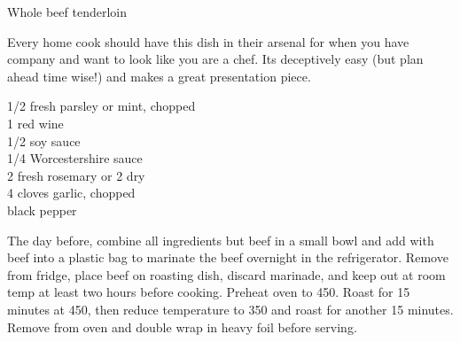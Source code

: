 \begin{entry}{Whole beef tenderloin}

\begin{open}
  Every home cook should have this dish in their arsenal for when you have
  company and want to look like you are a chef. Its deceptively easy (but plan
  ahead time wise!) and makes a great presentation piece.
\end{open}

\begin{ingredients}
    \SI{1/2}{\cup} fresh parsley or mint, chopped\\
    \SI{1}{\cup} red wine\\
    \SI{1/2}{\cup} soy sauce\\
    \SI{1/4}{\cup} Worcestershire sauce\\
    \SI{2}{\tblspoon} fresh rosemary or \SI{2}{\teaspoon} dry\\
    4 cloves garlic, chopped\\
    black pepper
\end{ingredients}


The day before, combine all ingredients but beef in a small bowl and add with
beef into a plastic bag to marinate the beef overnight in the
refrigerator. Remove from fridge, place beef on roasting dish, discard
marinade, and keep out at room temp at least two hours before cooking. Preheat
oven to \SI{450}{\degreeF}. Roast for 15 minutes at \SI{450}{\degreeF}, then
reduce temperature to 350 and roast for another 15 minutes. Remove from oven
and double wrap in heavy foil before serving.

\end{entry}